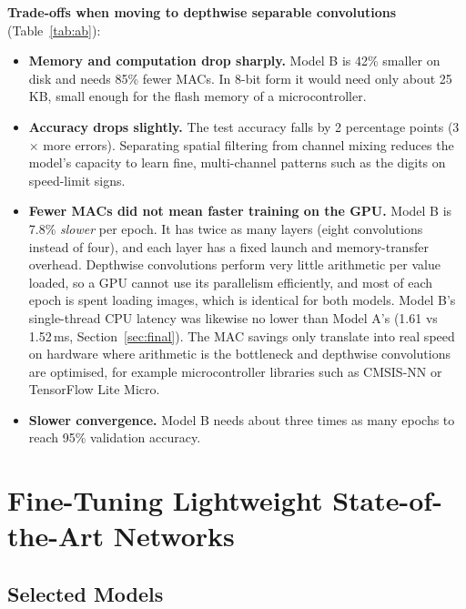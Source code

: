 \documentclass[11pt, a4paper]{article}
\begin{document}
\textbf{Trade-offs when moving to depthwise separable convolutions} (Table~\ref{tab:ab}):
\begin{itemize}
    \item \textbf{Memory and computation drop sharply.} Model B is 42\% smaller on disk and needs 85\% fewer MACs. In
          8-bit form it would need only about 25\,KB, small enough for the flash memory of a microcontroller.
    \item \textbf{Accuracy drops slightly.} The test accuracy falls by 2 percentage points (3$\times$ more errors).
          Separating spatial filtering from channel mixing reduces the model's capacity to learn fine,
          multi-channel patterns such as the digits on speed-limit signs.
    \item \textbf{Fewer MACs did not mean faster training on the GPU.} Model B is 7.8\% \emph{slower} per epoch.
          It has twice as many layers (eight convolutions instead of four), and each layer has a fixed launch and
          memory-transfer overhead. Depthwise convolutions perform very little arithmetic per value loaded, so a GPU
          cannot use its parallelism efficiently, and most of each epoch is spent loading images, which is identical
          for both models. Model B's single-thread CPU latency was likewise no lower than Model A's (1.61 vs 1.52\,ms,
          Section~\ref{sec:final}). The MAC savings only translate into real speed on hardware where arithmetic is the
          bottleneck and depthwise convolutions are optimised, for example microcontroller libraries such as
          CMSIS-NN or TensorFlow Lite Micro.
    \item \textbf{Slower convergence.} Model B needs about three times as many epochs to reach 95\% validation accuracy.
\end{itemize}

\section{Fine-Tuning Lightweight State-of-the-Art Networks}

\subsection{Selected Models}
\end{document}
